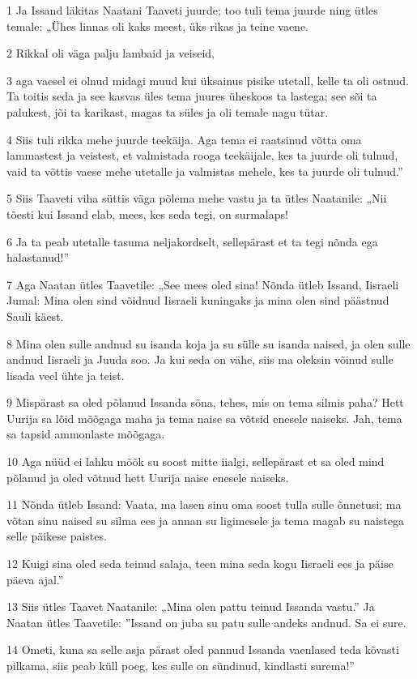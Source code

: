 \par 1 Ja Issand läkitas Naatani Taaveti juurde; too tuli tema juurde ning ütles temale: „Ühes linnas oli kaks meest, üks rikas ja teine vaene.
\par 2 Rikkal oli väga palju lambaid ja veiseid,
\par 3 aga vaesel ei olnud midagi muud kui üksainus pisike utetall, kelle ta oli ostnud. Ta toitis seda ja see kasvas üles tema juures üheskoos ta lastega; see sõi ta palukest, jõi ta karikast, magas ta süles ja oli temale nagu tütar.
\par 4 Siis tuli rikka mehe juurde teekäija. Aga tema ei raatsinud võtta oma lammastest ja veistest, et valmistada rooga teekäijale, kes ta juurde oli tulnud, vaid ta võttis vaese mehe utetalle ja valmistas mehele, kes ta juurde oli tulnud.”
\par 5 Siis Taaveti viha süttis väga põlema mehe vastu ja ta ütles Naatanile: „Nii tõesti kui Issand elab, mees, kes seda tegi, on surmalaps!
\par 6 Ja ta peab utetalle tasuma neljakordselt, sellepärast et ta tegi nõnda ega halastanud!”
\par 7 Aga Naatan ütles Taavetile: „See mees oled sina! Nõnda ütleb Issand, Iisraeli Jumal: Mina olen sind võidnud Iisraeli kuningaks ja mina olen sind päästnud Sauli käest.
\par 8 Mina olen sulle andnud su isanda koja ja su sülle su isanda naised, ja olen sulle andnud Iisraeli ja Juuda soo. Ja kui seda on vähe, siis ma oleksin võinud sulle lisada veel ühte ja teist.
\par 9 Mispärast sa oled põlanud Issanda sõna, tehes, mis on tema silmis paha? Hett Uurija sa lõid mõõgaga maha ja tema naise sa võtsid enesele naiseks. Jah, tema sa tapsid ammonlaste mõõgaga.
\par 10 Aga nüüd ei lahku mõõk su soost mitte iialgi, sellepärast et sa oled mind põlanud ja oled võtnud hett Uurija naise enesele naiseks.
\par 11 Nõnda ütleb Issand: Vaata, ma lasen sinu oma soost tulla sulle õnnetusi; ma võtan sinu naised su silma ees ja annan su ligimesele ja tema magab su naistega selle päikese paistes.
\par 12 Kuigi sina oled seda teinud salaja, teen mina seda kogu Iisraeli ees ja päise päeva ajal.”
\par 13 Siis ütles Taavet Naatanile: „Mina olen pattu teinud Issanda vastu.” Ja Naatan ütles Taavetile: ”Issand on juba su patu sulle andeks andnud. Sa ei sure.
\par 14 Ometi, kuna sa selle asja pärast oled pannud Issanda vaenlased teda kõvasti pilkama, siis peab küll poeg, kes sulle on sündinud, kindlasti surema!”

